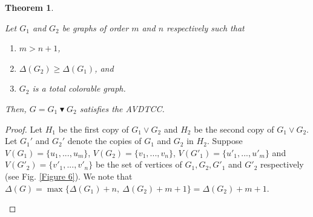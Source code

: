 \documentclass[10pt,a4paper]{amsart}
\newtheorem{thm}{Theorem}
\begin{document}
\begin{thm}\label{Theorem 8.1}
    {\em Let $G_1$ and $G_2$ be graphs of order $m$ and $n$ respectively such that
    \begin{enumerate}
        \item $m>n+1$,
        \item $\Delta(G_2)\geq\Delta(G_1)$, and
        \item $G_2$ is a total colorable graph.
    \end{enumerate}
    Then, $G=G_1\blacktriangledown G_2$ satisfies the AVDTCC.    
    }
\end{thm}

\begin{proof}
Let $H_1$ be the first copy of $G_1 \vee G_2$ and $H_2$ be the second copy of $G_1 \vee G_2$. Let $G_1'$ and $G_2'$ denote the copies of $G_1$ and $G_2$ in $H_2$. 
Suppose $V(G_1)=\{u_1,...,u_m\}$, $V(G_2)=\{v_1,...,v_n\}$, $V(G'_1)=\{u'_1,...,u'_m\}$ and $V(G'_2)=\{v'_1,...,v'_n\}$ be the set of vertices of $G_1, G_2, G'_1$ and $G'_2$ respectively (see Fig. \ref{Figure 6}). 
We note that $\Delta(G)=\max\{\Delta(G_1)+n,\ \Delta(G_2)+m+1\}=\Delta(G_2)+m+1.$

\begin{figure}[ht]
    \centering
\end{figure}
\end{proof}
\end{document}
